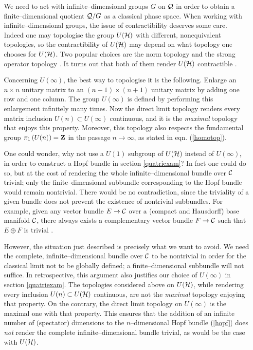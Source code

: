 \documentclass[a4paper,a4paper]{article}
\begin{document}
We need to act with infinite--dimensional groups $G$ on ${\cal Q}$ in order to 
obtain a finite--dimensional quotient ${\cal Q}/G$ as a classical phase space.
When working with infinite--dimensional groups, the issue of contractibility 
deserves some care. Indeed one may topologise the group $U({\cal H})$ with 
different, nonequivalent topologies, so the contractibility of $U({\cal H})$ 
may depend on what topology one chooses for $U({\cal H})$. Two popular 
choices are the norm topology and the strong operator topology \cite{DIXMIER}. 
It turns out that both of them render $U({\cal H})$ contractible 
\cite{KUIPER, DIXMIER}. 

Concerning $U(\infty)$, the best way to topologise it is the following.
Enlarge  an $n\times n$ unitary matrix to an $(n+1)\times (n+1)$ unitary 
matrix by adding one row and one column. The group $U(\infty)$ is defined 
by performing this enlargement infinitely many times. Now the direct limit 
topology \cite{BOURBAKI} renders every matrix inclusion $U(n)\subset U(\infty)$ 
continuous, and it is the {\it maximal} topology that enjoys this property. 
Moreover, this topology also respects the fundamental group $\pi_1\left(U(n)\right)={\bf Z}$ 
in the passage $n\to\infty$, as stated in eqn. (\ref{homotop}).

One could wonder, why not use a $U(1)$ subgroup of $U({\cal H})$ instead 
of $U(\infty)$, in order to construct a Hopf bundle in section \ref{quatriexam}? 
In fact one could do so, but at the cost of rendering the whole 
infinite--dimensional bundle over ${\cal C}$ trivial; only the finite--dimensional 
subbundle corresponding to the Hopf bundle would remain nontrivial. There would be no 
contradiction, since the triviality of a given bundle does not prevent 
the existence of nontrivial subbundles. For example, given any vector bundle 
$E\rightarrow {\cal C}$ over a (compact and Hausdorff) base manifold ${\cal C}$, 
there always exists a complementary vector bundle $F\rightarrow {\cal C}$ 
such that $E\oplus F$ is trivial \cite{ATIYAH}. 

However, the situation just described is precisely what we want to avoid. 
We need the complete, infinite--dimensional bundle over ${\cal C}$ to be nontrivial 
in order for the classical limit not to be globally defined; a 
finite--dimensional subbundle will not suffice. In retrospective, this argument
also justifies our choice of $U(\infty)$ in section \ref{quatriexam}. The 
topologies considered above on $U({\cal H})$, while rendering every inclusion $U(n)\subset 
U({\cal H})$ continuous, are not the {\it maximal} topology enjoying that 
property. On the contrary, the direct limit topology on $U(\infty)$ is the maximal 
one with that property. This ensures that the addition of an infinite 
number of (spectator) dimensions to the $n$--dimensional Hopf bundle (\ref{hopf}) 
does {\it not} render the complete infinite--dimensional bundle trivial,
as would be the case with $U({\cal H})$.
\end{document}
